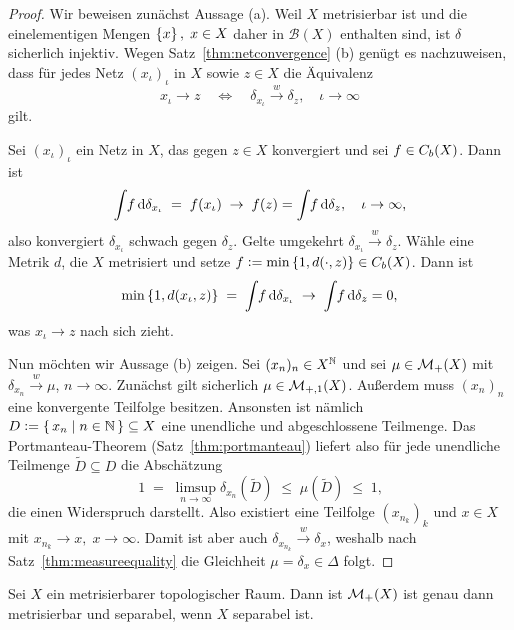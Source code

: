 \documentclass[../main/main.tex]{subfiles}
\begin{document}
	\begin{proof}
		Wir beweisen zunächst Aussage (a). Weil $X$ metrisierbar ist und die einelementigen Mengen $\left\{x\right\}, \; x \in X$ daher in $\mathcal{B}(X)$ enthalten sind, ist $\delta$ sicherlich injektiv.
		Wegen Satz~\ref{thm:netconvergence} (b) genügt es nachzuweisen, dass für jedes Netz $(x_\iota)_\iota$ in $X$ sowie $z \in X$ die Äquivalenz
		\[ x_\iota \to z \quad \iff \quad \delta_{x_\iota} \xrightarrow{w} \delta_z, \quad \iota \to \infty \]
		gilt. 
		
		Sei  $(x_\iota)_\iota$ ein Netz in $X$, das gegen $z \in X$ konvergiert und sei $f \in C_b(X)$. Dann ist
		\[ \int_{} \, f \, \mathrm{d}\delta_{x_\iota} \; = \; f(x_\iota) \; \to \; f(z) = \int_{} \, f \, \mathrm{d}\delta_{z}, \quad \iota \to \infty \text{,} \]
		also konvergiert $\delta_{x_\iota}$ schwach gegen $\delta_z$. Gelte umgekehrt $\delta_{x_\iota} \xrightarrow{w} \delta_z$. Wähle eine Metrik $d$, die $X$ metrisiert und
		setze $f \vcentcolon = \min \left\{1, d(\cdot, z)\right\} \in C_b(X)$. Dann ist 
		\[ \min \left\{1, d(x_\iota, z)\right\} \; = \; \int_{} \, f \, \mathrm{d}\delta_{x_\iota} \; \to \; \int_{} \, f \, \mathrm{d}\delta_{z} = 0 \text{,} \]
		was $x_\iota \to z$ nach sich zieht.
		
		Nun möchten wir Aussage (b) zeigen. Sei $(x_n)_n \in X^{\mathbb{N}}$ und sei $\mu \in \mathcal{M}_{+}(X)$ mit $\delta_{x_n} \xrightarrow{w} \mu$, $n \to \infty$. Zunächst gilt sicherlich $\mu \in \mathcal{M}_{+,1}(X)$.
		Außerdem muss $(x_n)_n$ eine konvergente Teilfolge besitzen. Ansonsten ist nämlich $D \vcentcolon = \left\{\, x_n \; \middle| \; n \in \mathbb{N} \,\right\} \subseteq X$ eine unendliche und abgeschlossene Teilmenge. Das Portmanteau-Theorem (Satz~\ref{thm:portmanteau}) liefert also für jede unendliche Teilmenge $\tilde{D} \subseteq D$ die Abschätzung
		\[ 1 \; = \; \limsup_{n \to \infty} \delta_{x_n}(\tilde{D}) \; \leq \; \mu(\tilde{D}) \; \leq \; 1 \text{,} \]
		die einen Widerspruch darstellt. Also existiert eine Teilfolge $(x_{n_k})_k$ und $x \in X$ mit $x_{n_k} \to x, \; x \to \infty$. Damit ist aber auch $\delta_{x_{n_k}} \xrightarrow{w} \delta_x$, weshalb nach
		Satz~\ref{thm:measureequality} die Gleichheit $\mu = \delta_x \in \Delta$ folgt.
	\end{proof}
	
	\begin{Satz}
		\label{thm:finitemeasuresmetrizableseparable}
		Sei $X$ ein metrisierbarer topologischer Raum. Dann ist $\mathcal{M}_{+}(X)$ ist genau dann metrisierbar und separabel, wenn $X$ separabel ist.
	\end{Satz}
\end{document}
